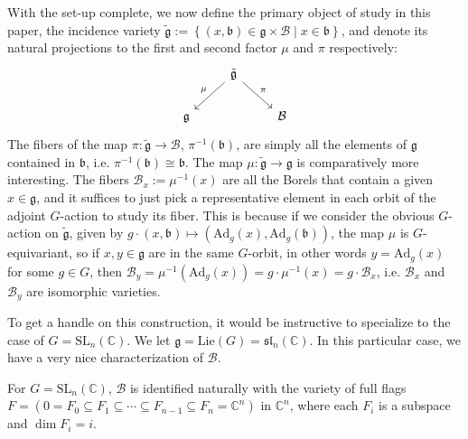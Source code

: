 \documentclass[11pt]{article}
\newcommand{\C}{\mathbb{C}}
\theoremstyle{definition}
\numberwithin{equation}{section} %
\begin{document}
With the set-up complete, we now define the primary object of study in this paper, the incidence variety $\tilde{\mathfrak{g}}:=\left\{(x,\mathfrak{b})\in \mathfrak{g}\times \mathcal{B}\mid x\in \mathfrak{b}\right\}$, and denote its natural projections to the first and second factor $\mu$ and $\pi$ respectively:
\[\begin{tikzcd}
	& {\tilde{\mathfrak{g}}} & \\
	{\mathfrak{g}} && {\mathcal{B}}
	\arrow["\mu"', from=1-2, to=2-1]
	\arrow["\pi", from=1-2, to=2-3]
\end{tikzcd}\]
The fibers of the map $\pi:\tilde{\mathfrak{g}}\to \mathcal{B}$, $\pi^{-1}(\mathfrak{b})$, are simply all the elements of $\mathfrak{g}$ contained in $\mathfrak{b}$, i.e. $\pi^{-1}(\mathfrak{b}) \cong \mathfrak{b}$. The map $\mu:\tilde{\mathfrak{g}}\to \mathfrak{g}$ is comparatively more interesting. The fibers $\mathcal{B}_x :=\mu^{-1}(x)$ are all the Borels that contain a given $x\in \mathfrak{g}$, and it suffices to just pick a representative element in each orbit of the adjoint $G$-action to study its fiber. This is because if we consider the obvious $G$-action on $\tilde{\mathfrak{g}}$, given by $g\cdot (x,\mathfrak{b})\mapsto \left(\mathrm{Ad}_g(x), \mathrm{Ad}_g(\mathfrak{b})\right)$, the map $\mu$ is $G$-equivariant, so if $x,y\in \mathfrak{g}$ are in the same $G$-orbit, in other words $y=\mathrm{Ad}_g(x)$ for some $g\in G$,  then $\mathcal{B}_y = \mu^{-1}\left(\mathrm{Ad}_g(x)\right) =g\cdot \mu^{-1}(x) = g\cdot \mathcal{B}_x$, i.e. $\mathcal{B}_x$ and $\mathcal{B}_y$ are isomorphic varieties. 

\smallskip

\noindent To get a handle on this construction, it would be instructive to specialize to the case of $G = \mathrm{SL}_n(\C)$. We let $\mathfrak{g}=\mathrm{Lie}(G) = \mathfrak{sl}_n(\C)$. In this particular case, we have a very nice characterization of $\mathcal{B}$.

\begin{lemma}
    For $G=\mathrm{SL}_n(\C)$, $\mathcal{B}$ is identified naturally with the variety of full flags $F = \left(0=F_0\subseteq F_1\subseteq \cdots \subseteq F_{n-1} \subseteq F_n = \C^n\right)$ in $\C^n$, where each $F_i$ is a subspace and $\dim F_i = i$. 
\end{lemma}
\end{document}
